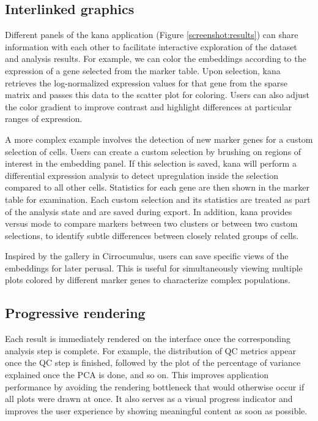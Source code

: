 \documentclass{article}
\begin{document}
\subsection{Interlinked graphics}

Different panels of the kana application (Figure \ref{screenshot:results}) can share information with each other to facilitate interactive exploration of the dataset and analysis results.
For example, we can color the embeddings according to the expression of a gene selected from the marker table.
Upon selection, kana retrieves the log-normalized expression values for that gene from the sparse matrix and passes this data to the scatter plot for coloring.
Users can also adjust the color gradient to improve contrast and highlight differences at particular ranges of expression.

A more complex example involves the detection of new marker genes for a custom selection of cells.
Users can create a custom selection by brushing on regions of interest in the embedding panel.
If this selection is saved, kana will perform a differential expression analysis to detect upregulation inside the selection compared to all other cells.
Statistics for each gene are then shown in the marker table for examination.
Each custom selection and its statistics are treated as part of the analysis state and are saved during export. In addition, kana  provides versus mode to compare markers between two clusters or between two custom selections, to identify subtle differences between closely related groups of cells.

Inspired by the gallery in Cirrocumulus, users can save specific views of the embeddings for later perusal.
This is useful for simultaneously viewing multiple plots colored by different marker genes to characterize complex populations.

\subsection{Progressive rendering}

Each result is immediately rendered on the interface once the corresponding analysis step is complete.
For example, the distribution of QC metrics appear once the QC step is finished, followed by the plot of the percentage of variance explained once the PCA is done, and so on.
This improves application performance by avoiding the rendering bottleneck that would otherwise occur if all plots were drawn at once. 
It also serves as a visual progress indicator and improves the user experience by showing meaningful content as soon as possible.
\end{document}
